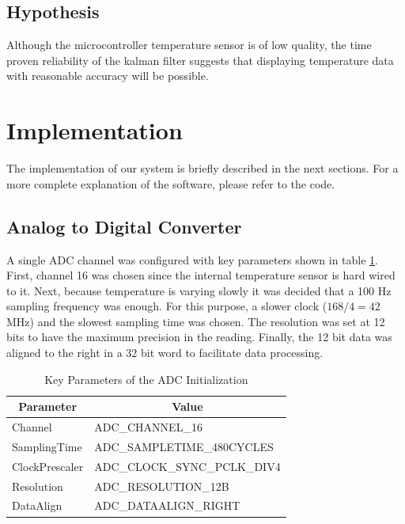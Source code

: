 \documentclass[12pt]{article}
\begin{document}
\subsection{Hypothesis}
Although the microcontroller temperature sensor is of low quality, the time proven reliability of the kalman filter suggests that displaying temperature data with reasonable accuracy will be possible. 

\section{Implementation}

The implementation of our system is briefly described in the next sections. For a more complete explanation of the software, please refer to the code. 

\subsection{Analog to Digital Converter}
A single ADC channel was configured with key parameters shown in table \ref{ADC_config}. First, channel 16 was chosen since the internal temperature sensor is hard wired to it. Next, because temperature is varying slowly it was decided that a 100 Hz sampling frequency was enough. For this purpose, a slower clock ($168/4 = 42$ MHz) and the slowest sampling time was chosen. The resolution was set at 12 bits to have the maximum precision in the reading. Finally, the 12 bit data was aligned to the right in a 32 bit word to facilitate data processing.
\begin{table}[H]
\centering
\caption{Key Parameters of the ADC Initialization}
\label{ADC_config}
\begin{tabular}{|l|l|}
\hline
\multicolumn{1}{|c|}{\textbf{Parameter}} & \multicolumn{1}{c|}{\textbf{Value}} \\ \hline
Channel                                  & ADC\_CHANNEL\_16                    \\ \hline
SamplingTime                             & ADC\_SAMPLETIME\_480CYCLES          \\ \hline
ClockPrescaler                           & ADC\_CLOCK\_SYNC\_PCLK\_DIV4        \\ \hline
Resolution                               & ADC\_RESOLUTION\_12B                \\ \hline
DataAlign                                & ADC\_DATAALIGN\_RIGHT               \\ \hline
\end{tabular}
\end{table}
\end{document}
